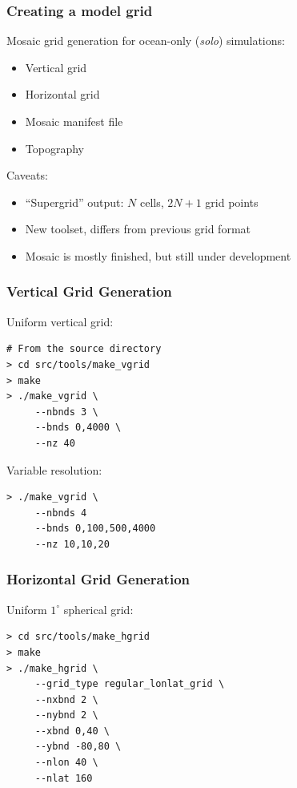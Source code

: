 \documentclass[red]{beamer}
\begin{document}
\begin{frame}
    \frametitle{Creating a model grid}
    
    Mosaic grid generation for ocean-only (\textit{solo}) simulations:
    \begin{itemize}
        \item Vertical grid
        \item Horizontal grid
        \item Mosaic manifest file
        \item Topography
    \end{itemize}
    
    Caveats:
    \begin{itemize}
        \item ``Supergrid'' output: $N$ cells, $2N+1$ grid points
        \item New toolset, differs from previous grid format
        \item Mosaic is mostly finished, but still under development
    \end{itemize}
\end{frame}

\begin{frame}[fragile]
    \frametitle{Vertical Grid Generation}
    
    Uniform vertical grid:
    \begin{lstlisting}
# From the source directory
> cd src/tools/make_vgrid
> make
> ./make_vgrid \
     --nbnds 3 \
     --bnds 0,4000 \
     --nz 40
    \end{lstlisting}
    
    Variable resolution:
    \begin{lstlisting}
> ./make_vgrid \
     --nbnds 4
     --bnds 0,100,500,4000
     --nz 10,10,20
    \end{lstlisting}
\end{frame}
\begin{frame}[fragile]
    \frametitle{Horizontal Grid Generation}
   
    Uniform $1^\circ$ spherical grid:
    \begin{lstlisting}
> cd src/tools/make_hgrid
> make
> ./make_hgrid \
     --grid_type regular_lonlat_grid \
     --nxbnd 2 \
     --nybnd 2 \
     --xbnd 0,40 \
     --ybnd -80,80 \
     --nlon 40 \
     --nlat 160
    \end{lstlisting}
\end{frame}
\end{document}
